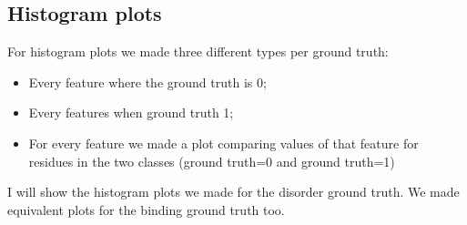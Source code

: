 \subsection{Histogram plots}

For histogram plots we made three different types per ground truth:

\begin{itemize}
    \item Every feature where the ground truth is 0;
    \item Every features when ground truth 1;
    \item For every feature we made a plot comparing values of that feature for residues in the two classes (ground truth=0 and ground truth=1)
\end{itemize}

I will show the histogram plots we made for the disorder ground truth. We made equivalent plots for the binding ground truth too.

